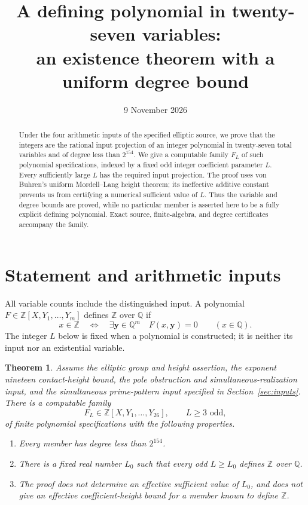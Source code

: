 \documentclass[11pt,a4paper]{article}
\title{A defining polynomial in twenty-seven variables:\\
an existence theorem with a uniform degree bound}
\author{}\date{9 November 2026}
\newtheorem{theorem}{Theorem}\newtheorem{lemma}[theorem]{Lemma}
\newcommand{\Q}{\mathbb Q}\newcommand{\Z}{\mathbb Z}
\begin{document}
\maketitle
\begin{abstract}
Under the four arithmetic inputs of the specified elliptic source,
we prove that the integers are the rational input projection of an
integer polynomial in twenty-seven total variables and of degree
less than $2^{154}$. We give a computable family $F_L$ of such
polynomial specifications, indexed by a fixed odd integer coefficient
parameter $L$. Every sufficiently large $L$ has the required input
projection. The proof uses von Buhren's uniform Mordell--Lang
height theorem; its ineffective additive constant prevents us from
certifying a numerical sufficient value of $L$. Thus the variable
and degree bounds are proved, while no particular member is asserted
here to be a fully explicit defining polynomial. Exact source,
finite-algebra, and degree certificates accompany the family.
\end{abstract}

\section{Statement and arithmetic inputs}

All variable counts include the distinguished input. A polynomial
$F\in\Z[X,Y_1,\ldots,Y_m]$ defines $\Z$ over $\Q$ if
\[
 x\in\Z\quad\Longleftrightarrow\quad
 \exists\mathbf y\in\Q^m\quad F(x,\mathbf y)=0
 \qquad(x\in\Q).
\]
The integer $L$ below is fixed when a polynomial is constructed;
it is neither its input nor an existential variable.

\begin{theorem}\label{thm:main}
Assume the elliptic group and height assertion, the exponent
nineteen contact-height bound, the pole obstruction and
simultaneous-realization input, and the simultaneous prime-pattern input
specified in Section~\ref{sec:inputs}. There is a computable
family
\[
 F_L\in\Z[X,Y_1,\ldots,Y_{26}],\qquad
 L\ge3\text{ odd},
\]
of finite polynomial specifications with the following properties.
\begin{enumerate}
\item Every member has degree less than $2^{154}$.
\item There is a fixed real number $L_0$ such that every odd
      $L\ge L_0$ defines $\Z$ over $\Q$.
\item The proof does not determine an effective sufficient
      value of $L_0$, and does not give an effective
      coefficient-height bound for a member known to define $\Z$.
\end{enumerate}
\end{theorem}
\end{document}

